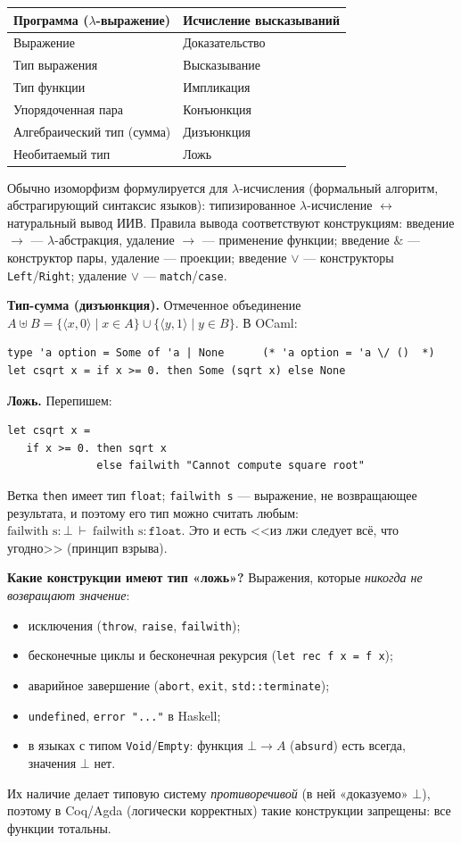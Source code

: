 \documentclass[11pt,a4paper]{article}
\newcommand{\amp}{\mathbin{\&}}
\newcommand{\vd}{\vdash}
\theoremstyle{definition}
\begin{document}
\begin{center}
\begin{tabular}{l|l}
Программа ($\lambda$-выражение)&Исчисление высказываний\\\hline
Выражение&Доказательство\\
Тип выражения&Высказывание\\
Тип функции&Импликация\\
Упорядоченная пара&Конъюнкция\\
Алгебраический тип (сумма)&Дизъюнкция\\
Необитаемый тип&Ложь
\end{tabular}
\end{center}
Обычно изоморфизм формулируется для $\lambda$-исчисления (формальный алгоритм, абстрагирующий синтаксис языков): типизированное $\lambda$-исчисление $\leftrightarrow$ натуральный вывод ИИВ.
Правила вывода соответствуют конструкциям: введение $\to$ --- $\lambda$-абстракция, удаление $\to$ --- применение функции; введение $\amp$ --- конструктор пары, удаление --- проекции; введение $\vee$ --- конструкторы \texttt{Left}/\texttt{Right}; удаление $\vee$ --- \texttt{match}/\texttt{case}.

\textbf{Тип-сумма (дизъюнкция).} Отмеченное объединение $A\uplus B=\{\langle x,0\rangle\mid x\in A\}\cup\{\langle y,1\rangle\mid y\in B\}$. В OCaml:
\begin{verbatim}
type 'a option = Some of 'a | None      (* 'a option = 'a \/ ()  *)
let csqrt x = if x >= 0. then Some (sqrt x) else None
\end{verbatim}

\textbf{Ложь.} Перепишем:
\begin{verbatim}
let csqrt x =
   if x >= 0. then sqrt x
              else failwith "Cannot compute square root"
\end{verbatim}
Ветка \texttt{then} имеет тип \texttt{float}; \texttt{failwith s} --- выражение, не возвращающее результата, и поэтому его тип можно считать любым: $\text{failwith s}:\bot\ \vd\ \text{failwith s}:\texttt{float}$. Это и есть <<из лжи следует всё, что угодно>> (принцип взрыва).

\textbf{Какие конструкции имеют тип «ложь»?} Выражения, которые \emph{никогда не возвращают значение}:
\begin{itemize}
\item исключения (\texttt{throw}, \texttt{raise}, \texttt{failwith});
\item бесконечные циклы и бесконечная рекурсия (\texttt{let rec f x = f x});
\item аварийное завершение (\texttt{abort}, \texttt{exit}, \texttt{std::terminate});
\item \texttt{undefined}, \texttt{error "..."} в Haskell;
\item в языках с типом \texttt{Void}/\texttt{Empty}: функция $\bot\to A$ (\texttt{absurd}) есть всегда, значения $\bot$ нет.
\end{itemize}
Их наличие делает типовую систему \emph{противоречивой} (в ней «доказуемо» $\bot$), поэтому в Coq/Agda (логически корректных) такие конструкции запрещены: все функции тотальны.
\end{document}
